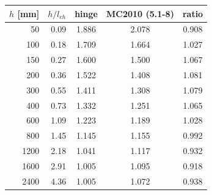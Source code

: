 \begin{tabular}{r r cc c}
\toprule
$h$ [mm] & $h/l_{ch}$ & hinge & MC2010 (5.1-8) & ratio\\
\midrule
50 & 0.09 & 1.886 & 2.078 & 0.908\\
100 & 0.18 & 1.709 & 1.664 & 1.027\\
150 & 0.27 & 1.600 & 1.500 & 1.067\\
200 & 0.36 & 1.522 & 1.408 & 1.081\\
300 & 0.55 & 1.411 & 1.308 & 1.079\\
400 & 0.73 & 1.332 & 1.251 & 1.065\\
600 & 1.09 & 1.223 & 1.189 & 1.028\\
800 & 1.45 & 1.145 & 1.155 & 0.992\\
1200 & 2.18 & 1.041 & 1.117 & 0.932\\
1600 & 2.91 & 1.005 & 1.095 & 0.918\\
2400 & 4.36 & 1.005 & 1.072 & 0.938\\
\bottomrule
\end{tabular}
